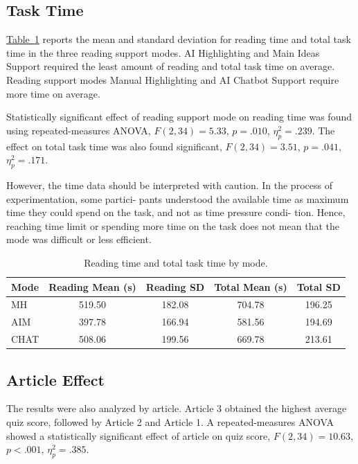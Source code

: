 \documentclass{IEEEtran}
\begin{document}
\subsection{Task Time}

\hyperref[tab:time_by_mode]{Table~\ref*{tab:time_by_mode}} reports the mean and standard deviation for reading time and total task time in the three reading support modes. AI Highlighting and Main Ideas Support required the least amount of reading and total task time on average. Reading support modes Manual Highlighting and AI Chatbot Support require more time on average.

Statistically significant effect of reading support mode
on reading time was found using repeated-measures ANOVA, $F(2,34)=5.33$, $p=.010$, $\eta_p^2=.239$. The effect on total
task time was also found significant, $F(2,34)=3.51$, $p=.041$, $\eta_p^2=.171$.

However, the time data should be interpreted with
caution. In the process of experimentation, some partici-
pants understood the available time as maximum time they
could spend on the task, and not as time pressure condi-
tion. Hence, reaching time limit or spending more time on
the task does not mean that the mode was difficult or less
efficient.

\begin{table}[H]
\centering
\caption{Reading time and total task time by mode.}
\label{tab:time_by_mode}
\scriptsize
\begin{tabular}{lcccc}
\hline
Mode & Reading Mean (s) & Reading SD & Total Mean (s) & Total SD \\
\hline
MH & 519.50 & 182.08 & 704.78 & 196.25 \\
AIM & 397.78 & 166.94 & 581.56 & 194.69 \\
CHAT & 508.06 & 199.56 & 669.78 & 213.61 \\
\hline
\end{tabular}
\end{table}

\subsection{Article Effect}

The results were also analyzed by article. Article 3 obtained the highest average quiz score, followed by Article 2 and Article 1. A repeated-measures ANOVA showed a statistically significant effect of article on quiz score, $F(2,34)=10.63$, $p<.001$, $\eta_p^2=.385$.
\end{document}
